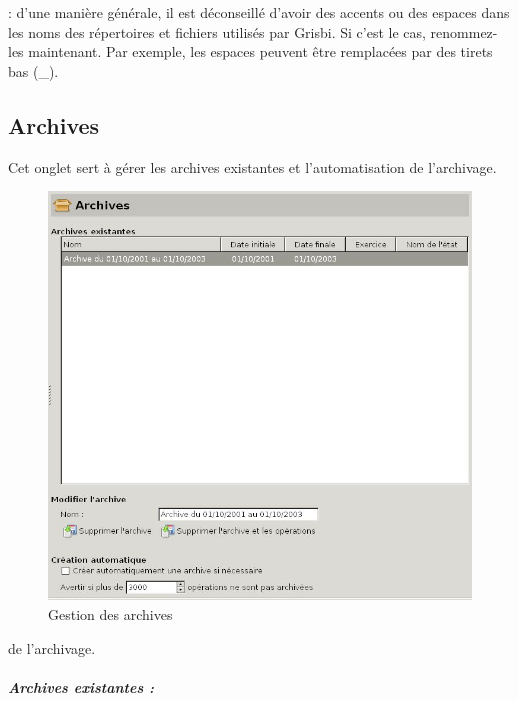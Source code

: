  : d'une manière générale, il est déconseillé d'avoir des accents ou des espaces dans les noms des répertoires et fichiers utilisés par Grisbi. Si c'est le cas, renommez-les maintenant. Par exemple, les espaces peuvent être remplacées par des tirets bas (\_). 

\ifIllustration
\else
\newpage
\fi


\subsection{Archives\label{setup-general-archives}}

Cet onglet sert à gérer les archives existantes et l'automatisation \ifIllustration de l'archivage.
\begin{figure}[htb]
\begin{center}
\includegraphics[scale=0.50]{image/screenshot/setup_history}
\end{center}
\caption{Gestion des archives}
\label{setup-history-img}
\end{figure}
\else de l'archivage.
\fi


\subparagraph{Archives existantes :\label{setup-general-archives-existing}}

